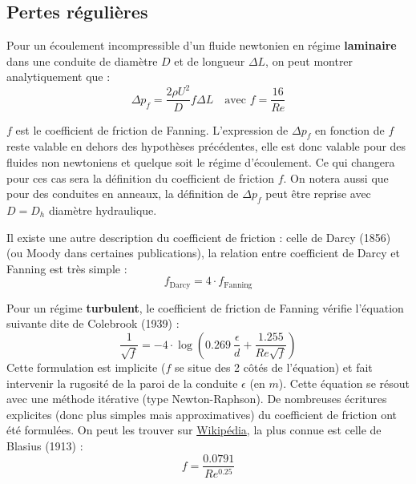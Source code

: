 \subsection{Pertes régulières}
%
\begin{center}
\end{center}
%
Pour un écoulement incompressible d'un fluide newtonien en régime \textbf{laminaire} dans une conduite de diamètre $D$ et de longueur $\Delta L$, on peut montrer analytiquement que :
%
\begin{equation}
\Delta p_f = \frac{2\rho U^2}{D} f \Delta L \quad\text{avec } f = \frac{16}{Re}
\end{equation}

$f$ est le coefficient de friction de Fanning. L'expression de $\Delta p_f$ en fonction de $f$ reste valable en dehors des hypothèses précédentes, elle est donc valable pour des fluides non newtoniens et quelque soit le régime d'écoulement. Ce qui changera pour ces cas sera la définition du coefficient de friction $f$. On notera aussi que pour des conduites en anneaux, la définition de $\Delta p_f$ peut être reprise avec $D = D_h$ diamètre hydraulique.

Il existe une autre description du coefficient de friction : celle de Darcy (1856) (ou Moody dans certaines publications), la relation entre coefficient de Darcy et Fanning est très simple :
%
\begin{equation}
f_{\text{Darcy}} = 4\cdot f_{\text{Fanning}}
\end{equation}

Pour un régime \textbf{turbulent}, le coefficient de friction de Fanning vérifie l'équation suivante dite de Colebrook (1939) :
%
\begin{equation}
\frac{1}{\sqrt{f}} = -4\cdot\log\left(0.269~\frac{\epsilon}{d} + \frac{1.255}{Re\sqrt{f}}\right)
\end{equation}
%
Cette formulation est implicite ($f$ se situe des 2 côtés de l'équation) et fait intervenir la rugosité de la paroi de la conduite $\epsilon$ (en $m$). Cette équation se résout avec une méthode itérative (type Newton-Raphson). De nombreuses écritures explicites (donc plus simples mais approximatives) du coefficient de friction ont été formulées. On peut les trouver sur \href{https://en.wikipedia.org/wiki/Darcy_friction_factor_formulae}{Wikipédia}, la plus connue est celle de Blasius (1913) :
%
\begin{equation}
f = \frac{0.0791}{Re^{0.25}}
\end{equation}


